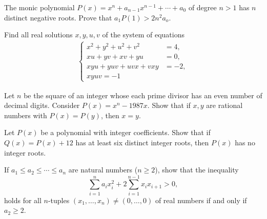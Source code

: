\documentclass[12pt,a4paper]{memoir}
\theoremstyle{definition}
\begin{document}
\begin{question}[name={1986 Austrian--Polish}]
	The monic polynomial $P(x) = x^n + a_{n-1}x^{n-1} +\cdots+ a_0$ of degree $n > 1$ has $n$ distinct negative roots. Prove that $a_1P(1) > 2n^2a_o$.
\end{question}




\begin{question}[name={1986 Austrian--Polish}]
	Find all real solutions $x,y,u,v$ of the system of equations
	\begin{align*}
		\begin{cases}
			x^2 + y^2 + u^2 + v^2 &= 4,\\
			xu + yv + xv + yu &= 0,\\
			xyu + yuv + uvx + vxy &= - 2,\\
			xyuv = -1
		\end{cases}
	\end{align*}
\end{question}




\begin{question}[name={1987 Austrian--Polish}]
	Let $n$ be the square of an integer whose each prime divisor has an even number of decimal digits. Consider $P(x) = x^n - 1987x$. Show that if $x,y$ are rational numbers with $P(x) = P(y)$, then $x = y$.
\end{question}




\begin{question}[name={1988 Austrian--Polish}]
	Let $P(x)$ be a polynomial with integer coefficients. Show that if $Q(x) = P(x) +12$ has at least six distinct integer roots, then $P(x)$ has no integer roots.
\end{question}




\begin{question}[name={1988 Austrian--Polish}]
	If $a_1 \le  a_2 \le  \cdots \le  a_n$ are natural numbers ($n \ge 2$), show that the inequality $$\sum_{i=1}^n a_ix_i^2 +2\sum_{i=1}^{n-1} x_ix_{i+1}  >0,$$ holds for all $n$-tuples $(x_1,\dots,x_n) \ne (0,\dots, 0)$ of real numbers if and only if $a_2 \ge 2$.
\end{question}
\end{document}
